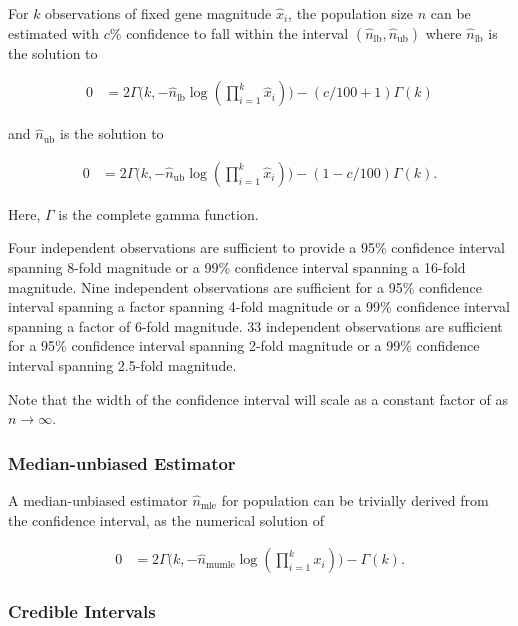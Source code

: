 For $k$ observations of fixed gene magnitude $\hat{x}_i$, the population size $n$ can be estimated with $c\%$ confidence to fall within the interval $(\hat{n}_\mathrm{lb}, \hat{n}_\mathrm{ub})$ where $\hat{n}_\mathrm{lb}$ is the solution to

\begin{align} \label{eqn:popsize_mle_ci_lb}
0
&= 2\Gamma\Big(k, -\hat{n}_\mathrm{lb}\log(\prod_{i=1}^k\hat{x}_i)\Big) - (c/100+1)\Gamma(k)
\end{align}

and $\hat{n}_\mathrm{ub}$ is the solution to

\begin{align} \label{eqn:popsize_mle_ci_ub}
  0
  &= 2\Gamma\Big(k, -\hat{n}_\mathrm{ub}\log(\prod_{i=1}^k\hat{x}_i)\Big) - (1-c/100)\Gamma(k).
\end{align}

Here, $\Gamma$ is the complete gamma function.

Four independent observations are sufficient to provide a 95\% confidence interval spanning 8-fold magnitude or a 99\% confidence interval spanning a 16-fold magnitude.
Nine independent observations are sufficient for a 95\% confidence interval spanning a factor spanning 4-fold magnitude or a 99\% confidence interval spanning a factor of 6-fold magnitude.
33 independent observations are sufficient for a 95\% confidence interval spanning 2-fold magnitude or a 99\% confidence interval spanning 2.5-fold magnitude.

Note that the width of the confidence interval will scale as a constant factor of as $n \to \infty$.

\subsubsection{Median-unbiased Estimator}

A median-unbiased estimator $\hat{n}_\mathrm{mle}$ for population can be trivially derived from the confidence interval, as the numerical solution of

\begin{align*}
0
&= 2\Gamma\Big(k, -\hat{n}_\mathrm{mumle}\log(\prod_{i=1}^k x_i)\Big) - \Gamma(k).
\end{align*}

\subsubsection{Credible Intervals}

